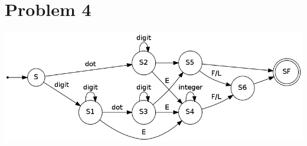 \documentclass{article}
\begin{document}
\section*{Problem 4}
\begin{center}
\includegraphics[scale=0.5]{nfa_float.png}
\end{center}
\end{document}
